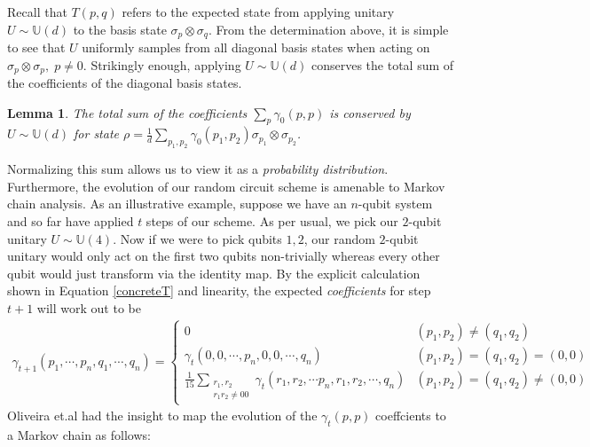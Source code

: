 \documentclass[12pt]{amsart}
\newtheorem{lemma}[theorem]{Lemma}
\theoremstyle{definition}
\theoremstyle{remark}
\numberwithin{equation}{section}
\theoremstyle{remark}
\begin{document}
%
Recall that $T(p,q)$ refers to the expected state from applying unitary $U \sim \mathbb{U}(d)$ to the basis state $\sigma_p \otimes \sigma_q$. From the determination above, it is simple to see that $U$ uniformly samples from all diagonal basis states when acting on $\sigma_p \otimes \sigma_p, \; p \neq 0$. Strikingly enough, applying $U \sim \mathbb{U}(d)$ conserves the total sum of the coefficients of the diagonal basis states.
%
\begin{lemma}
  The total sum of the coefficients $\sum_{p} \gamma_0(p,p)$ is conserved by $U \sim \mathbb{U}(d)$ for state $\rho = \frac{1}{d}\sum_{p_1,p_2} \gamma_0(p_1,p_2) \sigma_{p_1} \otimes \sigma_{p_2}$.
\end{lemma}
%
Normalizing this sum allows us to view it as a \emph{probability distribution}. Furthermore, the evolution of our random circuit scheme is amenable to Markov chain analysis. As an illustrative example, suppose we have an $n$-qubit system and so far have applied $t$ steps of our scheme. As per usual, we pick our $2$-qubit unitary $U \sim \mathbb{U}(4)$. Now if we were to pick qubits $1,2$, our random $2$-qubit unitary would only act on the first two qubits non-trivially whereas every other qubit would just transform via the identity map. By the explicit calculation shown in Equation \ref{concreteT} and linearity, the expected \emph{coefficients} for step $t+1$ will work out to be
%
\begin{align} \label{evolexample}
    \gamma_{t+1}(p_1,\cdots,p_n,q_1,\cdots,q_n) = \begin{cases}
       0 & (p_1 ,p_2) \neq (q_1, q_2) \\
       \gamma_t(0,0,\cdots, p_n, 0,0,\cdots,q_n ) & (p_1,p_2) = (q_1, q_2) = (0,0) \\
       \frac{1}{15}\sum_{\substack{r_1,r_2 \\ r_1r_2 \neq 00}} \gamma_t(r_1,r_2,\cdots p_n,r_1,r_2,\cdots,q_n) & (p_1,p_2) = (q_1,q_2) \neq (0,0)
    \end{cases}
\end{align}
 Oliveira et.al \cite{oliveira} had the insight to map the evolution of the $\gamma_t(p,p)$ coeffcients to a Markov chain as follows:
%
\end{document}
